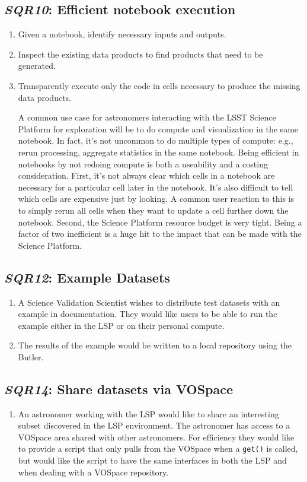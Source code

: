 \documentclass[DM,toc,lsstdraft]{lsstdoc}
\newcommand{\usecase}[3]{%
\subsection{\emph{#1}: #2}
\label{use:#1}
\begin{enumerate}[label=\alph*.]
#3
\end{enumerate}
}
\begin{document}
\usecase{SQR10}{Efficient notebook execution}{%

\item
Given a notebook, identify necessary inputs and outputs.

\item
Inspect the existing data products to find products that need to be generated.

\item
Transparently execute only the code in cells necessary to produce the missing data products.

A common use case for astronomers interacting with the LSST Science Platform for exploration will be to do compute and visualization in the same notebook.
In fact, it's not uncommon to do multiple types of compute: e.g., rerun processing, aggregate statistics in the same notebook.
Being efficient in notebooks by not redoing compute is both a useability and a costing consideration.
First, it's not always clear which cells in a notebook are necessary for a particular cell later in the notebook.
It's also difficult to tell which cells are expensive just by looking.
A common user reaction to this is to simply rerun all cells when they want to update a cell further down the notebook.
Second, the Science Platform resource budget is very tight.
Being a factor of two inefficient is a huge hit to the impact that can be made with the Science Platform.

}

\usecase{SQR12}{Example Datasets}{%

\item
A Science Validation Scientist wishes to distribute test datasets with an example in documentation.
They would like users to be able to run the example either in the LSP or on their personal compute.

\item
The results of the example would be written to a local repository using the Butler.

}

\usecase{SQR14}{Share datasets via VOSpace}{%

\item
An astronomer working with the LSP would like to share an interesting subset discovered in the LSP environment.
The astronomer has access to a VOSpace area shared with other astronomers.
For efficiency they would like to provide a script that only pulls from the VOSpace when a \texttt{get()} is called, but would like the script to have the same interfaces in both the LSP and when dealing with a VOSpace repository.

}
\end{document}
